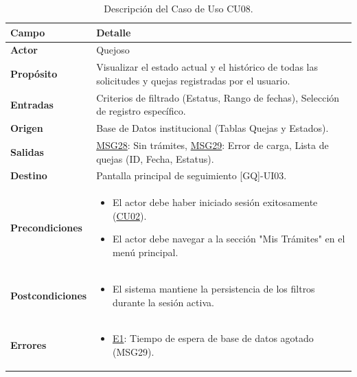 \begin{appendices}
\begin{table}[htbp]
\centering
\small
\begin{tabular}{|p{3.5cm}|p{10.5cm}|}
\hline
\rowcolor[HTML]{EFEFEF} 
\textbf{Campo} & \textbf{Detalle} \\ \hline
\textbf{Actor} & Quejoso \\ \hline
\textbf{Propósito} & Visualizar el estado actual y el histórico de todas las solicitudes y quejas registradas por el usuario. \\ \hline
\textbf{Entradas} & Criterios de filtrado (Estatus, Rango de fechas), Selección de registro específico. \\ \hline
\textbf{Origen} & Base de Datos institucional (Tablas Quejas y Estados). \\ \hline
\textbf{Salidas} & \hyperlink{msg:MSG28}{MSG28}: Sin trámites, \hyperlink{msg:MSG29}{MSG29}: Error de carga, Lista de quejas (ID, Fecha, Estatus). \\ \hline
\textbf{Destino} & Pantalla principal de seguimiento [GQ]-UI03. \\ \hline
\textbf{Precondiciones} & 
\begin{itemize}[nosep, leftmargin=*]
    \item El actor debe haber iniciado sesión exitosamente (\hyperlink{anexo:casos_uso}{CU02}).
    \item El actor debe navegar a la sección "Mis Trámites" en el menú principal.
\end{itemize} \\ \hline
\textbf{Postcondiciones} & 
\begin{itemize}[nosep, leftmargin=*]
    \item El sistema mantiene la persistencia de los filtros durante la sesión activa.
\end{itemize} \\ \hline
\textbf{Errores} & 
\begin{itemize}[nosep, leftmargin=*]
    \item \hyperlink{err:E14}{E1}: Tiempo de espera de base de datos agotado (MSG29).
\end{itemize} \\ \hline
\end{tabular}
\caption{Descripción del Caso de Uso CU08.}
\label{tab:cu08_especificacion}
\end{table}


\end{appendices}
